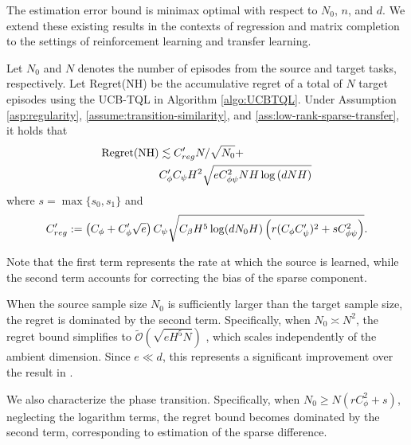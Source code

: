 \begin{remark}
The estimation error bound is minimax optimal with respect to $N_0$, $n$, and $d$. 
We extend these existing results in the contexts of regression and matrix completion \cite{chai2024structured} to the settings of reinforcement learning and transfer learning.
\end{remark}

\begin{theorem} \label{thm:regret-UCB-TQL}
Let $N_0$ and $N$ denotes the number of episodes from the source and target tasks, respectively.
Let {\rm Regret(NH)}  be the accumulative regret of a total of $N$ target episodes using the UCB-TQL in Algorithm \ref{algo:UCBTQL}. 
Under Assumption \ref{asp:regularity}, \ref{assume:transition-similarity}, and \ref{ass:low-rank-sparse-transfer}, it holds that
\begin{align*}
{\rm Regret(NH)} %
&\lesssim C'_{reg}N/\sqrt{N_0}
+\\&C_{\phi}'C_{\psi}H^2\sqrt{e C_{\phi\psi}^2NH\log\left(dNH\right)}
\end{align*}
where $s=\max\{s_0,s_1\}$ and 
\begin{equation}
\scriptsize
C'_{reg}:=\left(C_{\phi}+C_{\phi}'\sqrt{e}\right)C_{\psi}\sqrt{C_\beta H^5\log(dN_0H)\left(r(C_\phi C'_{\psi})^2 +sC_{\phi\psi}^2\right)}.
\end{equation}

\end{theorem}

\begin{remark}
Note that the first term represents the rate at which the source is learned, while the second term accounts for correcting the bias of the sparse component. 

When the source sample size $N_0$ is sufficiently larger than the target sample size, the regret is dominated by the second term. Specifically, when $N_0 \asymp N^2$, the regret bound simplifies to $\tilde{\mathcal{O}}(\sqrt{eH^5N})$ , which scales independently of the ambient dimension. Since $e\ll d$, this represents a significant improvement over the result in \cite{yang2020reinforcement}. 

We also characterize the phase transition. Specifically, when $N_0\ge N(rC_\phi^2+s)$, neglecting the logarithm terms, the regret bound becomes dominated by the second term, corresponding to estimation of the sparse difference.
\end{remark}

